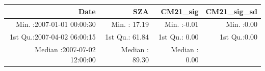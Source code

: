 \documentclass[
  10pt,
  a4paper,oneside]{article}
\begin{document}
\begin{longtable}[]{@{}rrrr@{}}
\toprule
\begin{minipage}[b]{0.34\columnwidth}\raggedleft
Date\strut
\end{minipage} & \begin{minipage}[b]{0.19\columnwidth}\raggedleft
SZA\strut
\end{minipage} & \begin{minipage}[b]{0.18\columnwidth}\raggedleft
CM21\_sig\strut
\end{minipage} & \begin{minipage}[b]{0.18\columnwidth}\raggedleft
CM21\_sig\_sd\strut
\end{minipage}\tabularnewline
\midrule
\endhead
\begin{minipage}[t]{0.34\columnwidth}\raggedleft
Min. :2007-01-01 00:00:30\strut
\end{minipage} & \begin{minipage}[t]{0.19\columnwidth}\raggedleft
Min. : 17.19\strut
\end{minipage} & \begin{minipage}[t]{0.18\columnwidth}\raggedleft
Min. :-0.01\strut
\end{minipage} & \begin{minipage}[t]{0.18\columnwidth}\raggedleft
Min. :0.00\strut
\end{minipage}\tabularnewline
\begin{minipage}[t]{0.34\columnwidth}\raggedleft
1st Qu.:2007-04-02 06:00:15\strut
\end{minipage} & \begin{minipage}[t]{0.19\columnwidth}\raggedleft
1st Qu.: 61.84\strut
\end{minipage} & \begin{minipage}[t]{0.18\columnwidth}\raggedleft
1st Qu.: 0.00\strut
\end{minipage} & \begin{minipage}[t]{0.18\columnwidth}\raggedleft
1st Qu.:0.00\strut
\end{minipage}\tabularnewline
\begin{minipage}[t]{0.34\columnwidth}\raggedleft
Median :2007-07-02 12:00:00\strut
\end{minipage} & \begin{minipage}[t]{0.19\columnwidth}\raggedleft
Median : 89.30\strut
\end{minipage} & \begin{minipage}[t]{0.18\columnwidth}\raggedleft
Median : 0.00\strut
\end{minipage} & \begin{minipage}[t]{0.18\columnwidth}\raggedleft

\end{minipage}
\end{longtable}
\end{document}
